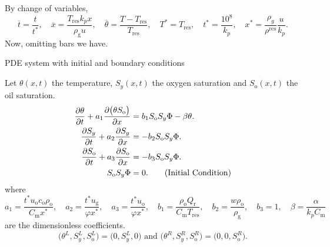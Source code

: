 \documentclass[
    8pt,
    aspectratio=1610,
    c,
    intlimits,
    leqno,
    professionalfonts,
]{beamer}
\begin{document}
\begin{frame}
	\frametitle{\secname}
	By change of variables,
	\begin{equation}
		\overline{t}=
		\frac{t}{t^{\ast}},\quad
		\overline{x}=
		\frac{T_{\text{res}}k_{p}x}{\rho_{\text{g}}u},\quad
		\overline{\theta}=
		\frac{T-T_{\text{res}}}{T_{\text{res}}},\quad
		T^{\ast}=T_{\text{res}},\quad
		t^{\ast}=
		\frac{10^{8}}{k_{p}},\quad
		x^{\ast}=
		\frac{\rho_{g}}{\rho^{\text{res}}}
		\frac{u}{k_{p}}.
	\end{equation}
	Now, omitting bars we have.

	\begin{block}{PDE system with initial and boundary
			conditions~\cite{Quispe2020}}

		Let $\theta\left(x,t\right)$ the \alert{temperature},
		$S_{y}\left(x,t\right)$ the \alert{oxygen saturation} and
		$S_{\text{o}}\left(x,t\right)$ the \alert{oil saturation}.
		\begin{align}
			\diffp{\theta}{t}+
			a_{1}
			\diffp{
				\big(
				\theta
				S_{\text{o}}
				\big)
			}{x}                    & =
			b_{1}
			S_{\text{o}}
			S_{y}
			\Phi-
			\beta\theta.
			\label{eq:6}                \\
			\diffp{S_{y}}{t}+
			a_{2}
			\diffp{S_{y}}{x}        & =
			-b_{2}
			S_{\text{o}}
			S_{y}
			\Phi.
			\label{eq:7}                \\
			\diffp{S_{\text{o}}}{t}+
			a_{3}
			\diffp{S_{\text{o}}}{x} & =
			-b_{3}
			S_{\text{o}}
			S_{y}
			\Phi.
			\label{eq:8}                \\
			S_{\text{o}}
			S_{y}
			\Phi                    & =
			0.
			\tag{Initial Condition}
		\end{align}
		where
		\begin{equation}
			a_{1}=
			\frac{
			t^{\ast}
			u_{\text{o}}
			c_{\text{o}}
			\rho_{\text{o}}
			}{C_{\text{m}}x^{\ast}},\quad
			a_{2}=
			\frac{t^{\ast}u_{\text{g}}}{\varphi x^{\ast}},\quad
			a_{3}=
			\frac{t^{\ast}u_{\text{o}}}{\varphi x^{\ast}},\quad
			b_{1}=
			\frac{
				\rho_{\text{o}}
				Q_{\text{r}}
			}{
				C_{\text{m}}
				T_{\text{res}}
			},\quad
			b_{2}=
			\frac{w\rho_{\text{o}}}{\rho_{\text{g}}},\quad
			b_{3}=
			1,\quad
			\beta=
			\frac{\alpha}{k_{p}C_{\text{m}}}
		\end{equation}
		are the dimensionless coefficients.
		\setcounter{equation}{12}
		\begin{equation}
			\big(
			\theta^{L},
			S^{L}_{y},
			S^{L}_{\text{o}}
			\big)=
			\big(
			0,
			S^{L}_{y},
			0
			\big)
			\text{ and }
			\big(
			\theta^{R},
			S^{R}_{y},
			S^{R}_{\text{o}}
			\big)                           =
			\big(
			0,
			0,
			S^{R}_{\text{o}}
			\big).
			\label{eq:13}
		\end{equation}
	\end{block}
\end{frame}
\end{document}

